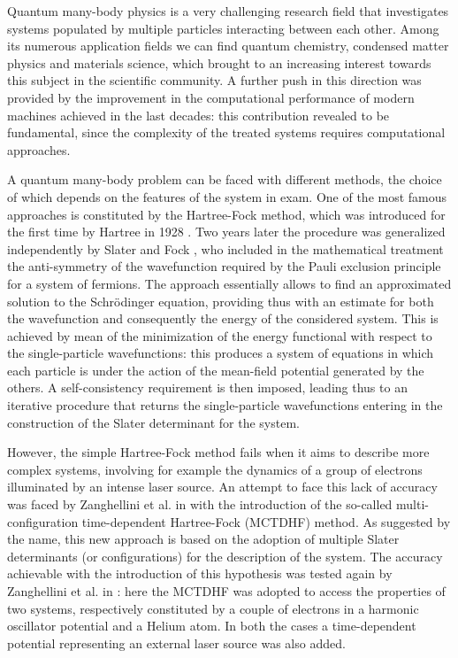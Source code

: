 Quantum many-body physics is a very challenging research field that investigates systems populated by multiple particles interacting between each other. Among its numerous application fields we can find quantum chemistry, condensed matter physics and materials science, which brought to an increasing interest towards this subject in the scientific community. A further push in this direction was provided by the improvement in the computational performance of modern machines achieved in the last decades: this contribution revealed to be fundamental, since the complexity of the treated systems requires computational approaches. 

A quantum many-body problem can be faced with different methods, the choice of which depends on the features of the system in exam. One of the most famous approaches is constituted by the Hartree-Fock method, which was introduced for the first time by Hartree in 1928 \cite{hartree_1928}. Two years later the procedure was generalized independently by Slater \cite{slater} and Fock \cite{fock}, who included in the mathematical treatment the anti-symmetry of the wavefunction required by the Pauli exclusion principle for a system of fermions. The approach essentially allows to find an approximated solution to the Schr\"odinger equation, providing thus with an estimate for both the wavefunction and consequently the energy of the considered system. This is achieved by mean of the minimization of the energy functional with respect to the single-particle wavefunctions: this produces a system of equations in which each particle is under the action of the mean-field potential generated by the others. A self-consistency requirement is then imposed, leading thus to an iterative procedure that returns the single-particle wavefunctions entering in the construction of the Slater determinant for the system.

However, the simple Hartree-Fock method fails when it aims to describe more complex systems, involving for example the dynamics of a group of electrons illuminated by an intense laser source. An attempt to face this lack of accuracy was faced by Zanghellini et al. in \cite{Zanghellini_2003} with the introduction of the so-called multi-configuration time-dependent Hartree-Fock (MCTDHF) method. As suggested by the name, this new approach is based on the adoption of multiple Slater determinants (or configurations) for the description of the system. The accuracy achievable with the introduction of this hypothesis was tested again by Zanghellini et al. in \cite{Zanghellini_2004}: here the MCTDHF was adopted to access the properties of two systems, respectively constituted by a couple of electrons in a harmonic oscillator potential and a Helium atom. In both the cases a time-dependent potential representing an external laser source was also added. \\

